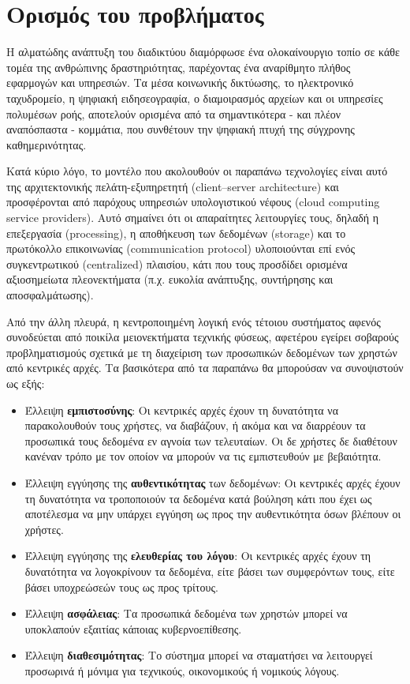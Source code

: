 \section{Ορισμός του προβλήματος}

Η αλματώδης ανάπτυξη του διαδικτύου διαμόρφωσε ένα ολοκαίνουργιο τοπίο σε κάθε τομέα της ανθρώπινης δραστηριότητας, παρέχοντας ένα αναρίθμητο πλήθος εφαρμογών και υπηρεσιών. Τα μέσα κοινωνικής δικτύωσης,
το ηλεκτρονικό ταχυδρομείο, η ψηφιακή ειδησεογραφία, ο διαμοιρασμός αρχείων και
οι υπηρεσίες πολυμέσων ροής, αποτελούν ορισμένα από τα σημαντικότερα - και πλέον αναπόσπαστα - κομμάτια,
που συνθέτουν την ψηφιακή πτυχή της σύγχρονης καθημερινότητας. 

Κατά κύριο λόγο, το μοντέλο που ακολουθούν οι παραπάνω τεχνολογίες είναι αυτό της αρχιτεκτονικής πελάτη-εξυπηρετητή (client–server architecture) και προσφέρονται από παρόχους υπηρεσιών υπολογιστικού νέφους (cloud computing service providers). Αυτό σημαίνει ότι οι απαραίτητες λειτουργίες τους, δηλαδή η επεξεργασία (processing), η αποθήκευση των δεδομένων (storage) και το πρωτόκολλο επικοινωνίας (communication protocol) υλοποιούνται επί ενός συγκεντρωτικού (centralized) πλαισίου, κάτι που τους προσδίδει ορισμένα αξιοσημείωτα πλεονεκτήματα (π.χ. ευκολία ανάπτυξης, συντήρησης και αποσφαλμάτωσης). 

Από την άλλη πλευρά, η κεντροποιημένη λογική ενός τέτοιου συστήματος αφενός συνοδεύεται από ποικίλα μειονεκτήματα τεχνικής φύσεως, αφετέρου εγείρει σοβαρούς προβληματισμούς σχετικά με τη διαχείριση των προσωπικών δεδομένων των χρηστών από κεντρικές αρχές. Τα βασικότερα από τα παραπάνω θα μπορούσαν να συνοψιστούν ως εξής: 

\begin{itemize}
	\item Έλλειψη \textbf{εμπιστοσύνης}: Οι κεντρικές αρχές έχουν τη δυνατότητα να παρακολουθούν τους χρήστες, να διαβάζουν, ή ακόμα και να διαρρέουν τα προσωπικά τους δεδομένα εν αγνοία των τελευταίων. Οι δε χρήστες δε διαθέτουν κανέναν τρόπο με τον οποίον να μπορούν να τις εμπιστευθούν με βεβαιότητα.
	\item Έλλειψη εγγύησης της \textbf{αυθεντικότητας} των δεδομένων: Οι κεντρικές αρχές έχουν τη δυνατότητα να τροποποιούν τα δεδομένα κατά βούληση κάτι που έχει ως αποτέλεσμα να μην υπάρχει εγγύηση ως προς την αυθεντικότητα όσων βλέπουν οι χρήστες.
	\item Έλλειψη εγγύησης της \textbf{ελευθερίας του λόγου}: Οι κεντρικές αρχές έχουν τη δυνατότητα να λογοκρίνουν τα δεδομένα, είτε βάσει των συμφερόντων τους, είτε βάσει υποχρεώσεών τους ως προς τρίτους.
	\item Έλλειψη \textbf{ασφάλειας}: Τα προσωπικά δεδομένα των χρηστών μπορεί να υποκλαπούν εξαιτίας κάποιας κυβερνοεπίθεσης.
	\item Έλλειψη \textbf{διαθεσιμότητας}: Το σύστημα μπορεί να σταματήσει να λειτουργεί προσωρινά ή μόνιμα για τεχνικούς, οικονομικούς ή νομικούς λόγους.
\end{itemize}
